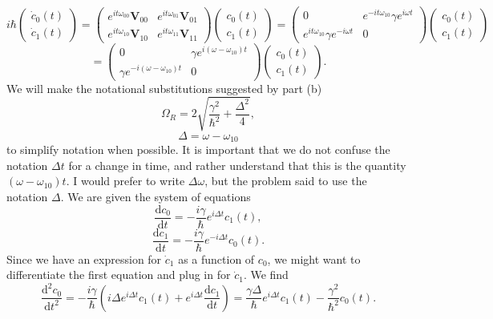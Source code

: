 \documentclass[11pt, letterpaper]{article}
\begin{document}
\[
	i\hbar \begin{pmatrix}
	\dot{c} _0(t) \\
	\dot{c} _1(t)
	\end{pmatrix}=\begin{pmatrix}
	e^{it\omega_{00} } \mathbf{V}_{00}  & e^{it\omega _{01} } \mathbf{V}_{01}  \\
	e^{it\omega _{10} } \mathbf{V} _{10}  & e^{it\omega _{11} } \mathbf{V} _{11} 
	\end{pmatrix}\begin{pmatrix}
	c_0(t) \\
	c_1(t)
	\end{pmatrix}=\begin{pmatrix}
	0 & e^{-it\omega _{10} } \gamma e^{i\omega t}  \\
	e^{it\omega _{10} } \gamma e^{-i\omega t}  & 0
	\end{pmatrix}\begin{pmatrix}
	c_0(t) \\
	c_1(t)
	\end{pmatrix}
\]
\[
	=\begin{pmatrix}
	0 & \gamma e^{i(\omega -\omega _{10} )t}  \\
	\gamma e^{-i(\omega -\omega _{10} )t}  & 0
	\end{pmatrix}\begin{pmatrix}
	c_0(t) \\
	c_1(t)
	\end{pmatrix}
.\]
We will make the notational substitutions suggested by part (b)
\[
	\Omega _R=2\sqrt{\frac{\gamma ^2}{\hbar^2} +\frac{\Delta ^2}{4} } ,
\]
\[
	\Delta =\omega -\omega _{10} 
\]
to simplify notation when possible. It is important that we do not confuse the notation $\Delta t$ for a change in time, and rather understand that this is the quantity $(\omega -\omega _{10} )t$. I would prefer to write $\Delta \omega $, but the problem said to use the notation $\Delta $. We are given the system of equations
\[
	\frac{\mathrm{d}c_0}{\mathrm{d}t} =-\frac{i\gamma }{\hbar} e^{i\Delta t} c_1(t),
\]
\[
	\frac{\mathrm{d}c_1}{\mathrm{d}t} =-\frac{i\gamma }{\hbar}  e^{-i\Delta t} c_0(t)
.\]
Since we have an expression for $\dot{c} _1$ as a function of $c_0$, we might want to differentiate the first equation and plug in for $\dot{c} _1$. We find
\[
	\frac{\mathrm{d}^2c_0}{\mathrm{d}t^2} =-\frac{i\gamma }{\hbar} \left( i\Delta e^{i\Delta t} c_1(t)+e^{i\Delta t} \frac{\mathrm{d}c_1}{\mathrm{d}t}  \right) =\frac{\gamma \Delta }{\hbar} e^{i\Delta t} c_1(t)-\frac{\gamma ^2}{\hbar^2} c_0(t)
.\]
\end{document}
